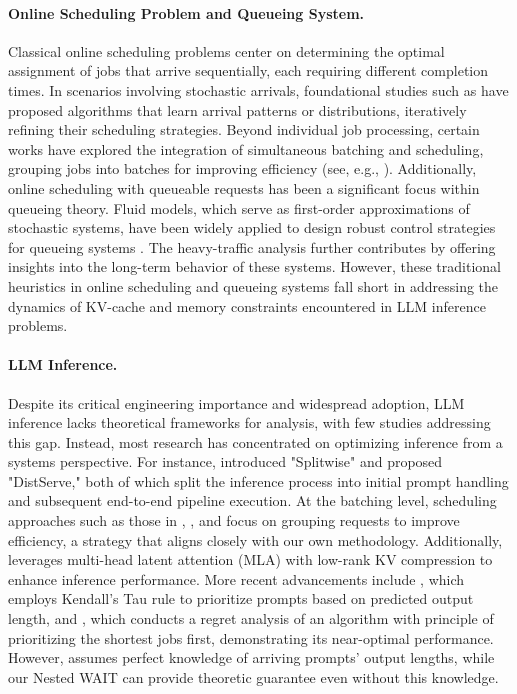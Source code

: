 \paragraph*{Online Scheduling Problem and Queueing System.} Classical online scheduling problems center on determining the optimal assignment of jobs that arrive sequentially, each requiring different completion times. In scenarios involving stochastic arrivals, foundational studies such as \cite{devanur2009adwords,vee2010optimal,cole2014sample,balkanski2016power,lattanzi2020online} have proposed algorithms that learn arrival patterns or distributions, iteratively refining their scheduling strategies. Beyond individual job processing, certain works have explored the integration of simultaneous batching and scheduling, grouping jobs into batches for improving efficiency (see, e.g., \cite{im2013online,lucier2013efficient,liu2015online,li2020online}). Additionally, online scheduling with queueable requests has been a significant focus within queueing theory. Fluid models, which serve as first-order approximations of stochastic systems, have been widely applied to design robust control strategies for queueing systems \cite{mandelbaum1998strong,maglaras2000discrete,bauerle2002optimal,liu2011network}. The heavy-traffic analysis further contributes by offering insights into the long-term behavior of these systems. However, these traditional heuristics in online scheduling and queueing systems fall short in addressing the dynamics of KV-cache and memory constraints encountered in LLM inference problems.

\paragraph*{LLM Inference.} Despite its critical engineering importance and widespread adoption, LLM inference lacks theoretical frameworks for analysis, with few studies addressing this gap. Instead, most research has concentrated on optimizing inference from a systems perspective. For instance, \cite{patel2023peeling} introduced "Splitwise" and \cite{zhong2024distserve} proposed "DistServe," both of which split the inference process into initial prompt handling and subsequent end-to-end pipeline execution. At the batching level, scheduling approaches such as those in \cite{yu2022orca}, \cite{agrawal2023sarathi}, and \cite{agrawal2024taming} focus on grouping requests to improve efficiency, a strategy that aligns closely with our own methodology. Additionally, \cite{deepseekai2024deepseekv2strongeconomicalefficient} leverages multi-head latent attention (MLA) with low-rank KV compression to enhance inference performance. More recent advancements include \cite{fu2025efficient}, which employs Kendall's Tau rule to prioritize prompts based on predicted output length, and \cite{jaillet2025onlineschedulingllminference}, which conducts a regret analysis of an algorithm with principle of prioritizing the shortest jobs first, demonstrating its near-optimal performance. However, \cite{jaillet2025onlineschedulingllminference} assumes perfect knowledge of arriving prompts' output lengths, while our Nested WAIT can provide theoretic guarantee even without this knowledge.


